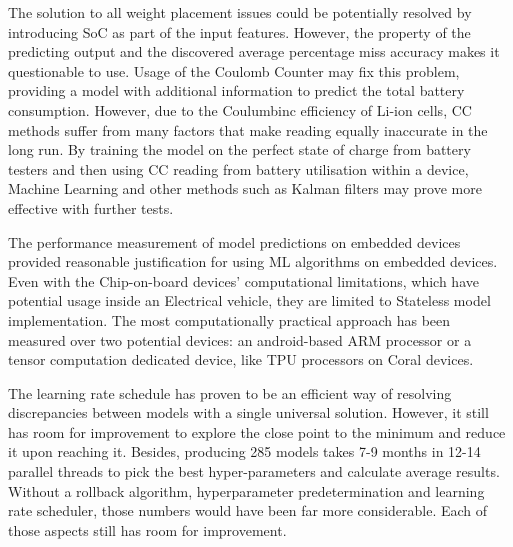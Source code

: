 %
%
The solution to all weight placement issues could be potentially resolved by introducing SoC as part of the input features.
However, the property of the predicting output and the discovered average percentage miss accuracy makes it questionable to use.
Usage of the Coulomb Counter may fix this problem, providing a model with additional information to predict the total battery consumption.
However, due to the Coulumbinc efficiency of Li-ion cells, CC methods suffer from many factors that make reading equally inaccurate in the long run.
By training the model on the perfect state of charge from battery testers and then using CC reading from battery utilisation within a device, Machine Learning and other methods such as Kalman filters may prove more effective with further tests.

%
%
 {
    
    The performance measurement of model predictions on embedded devices provided reasonable justification for using ML algorithms on embedded devices.
    Even with the Chip-on-board devices' computational limitations, which have potential usage inside an Electrical vehicle, they are limited to Stateless model implementation.
    The most computationally practical approach has been measured over two potential devices: an android-based ARM processor or a tensor computation dedicated device, like TPU processors on Coral devices.
} {
The learning rate schedule has proven to be an efficient way of resolving discrepancies between models with a single universal solution.
However, it still has room for improvement to explore the close point to the minimum and reduce it upon reaching it.
Besides, producing 285 models takes 7-9 months in 12-14 parallel threads to pick the best hyper-parameters and calculate average results.
Without a rollback algorithm, hyperparameter predetermination and learning rate scheduler, those numbers would have been far more considerable.
Each of those aspects still has room for improvement.
}
